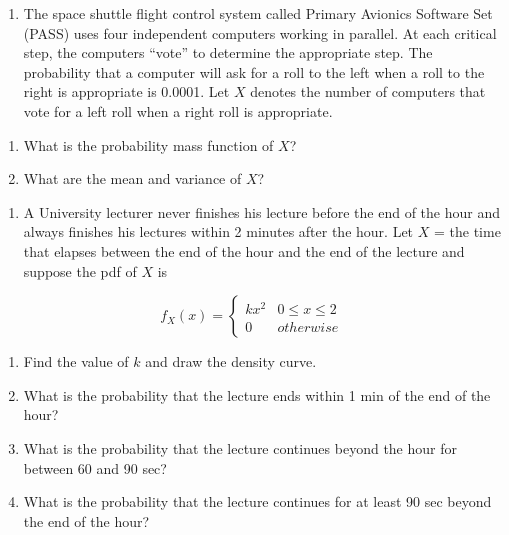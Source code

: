 \documentclass[]{book}
\providecommand{\tightlist}{%
  \setlength{\itemsep}{0pt}\setlength{\parskip}{0pt}}
\begin{document}
\begin{enumerate}
\def\labelenumi{\arabic{enumi}.}
\setcounter{enumi}{9}
\tightlist
\item
  The space shuttle flight control system called Primary Avionics Software Set (PASS) uses four independent computers working in parallel. At each critical step, the computers ``vote'' to determine the appropriate step. The probability that a computer will ask for a roll to the left when a roll to the right is appropriate is 0.0001. Let \(X\) denotes the number of computers that vote for a left roll when a right roll is appropriate.
\end{enumerate}

\begin{enumerate}
\def\labelenumi{\alph{enumi})}
\tightlist
\item
  What is the probability mass function of \(X\)?
\item
  What are the mean and variance of \(X\)?
\end{enumerate}

\begin{enumerate}
\def\labelenumi{\arabic{enumi}.}
\setcounter{enumi}{10}
\tightlist
\item
  A University lecturer never finishes his lecture before the end of the hour and always finishes his lectures within 2 minutes after the hour. Let \(X\) = the time that elapses between the end of the hour and the end of the lecture and suppose the pdf of \(X\) is
\end{enumerate}

\begin{equation}
f_X(x) =
\begin{cases} 
kx^2 & 0\leq  x\leq 2\\
0 & otherwise
\end{cases}
\end{equation}

\begin{enumerate}
\def\labelenumi{\alph{enumi})}
\tightlist
\item
  Find the value of \(k\) and draw the density curve.
\item
  What is the probability that the lecture ends within 1 min of the end of the hour?
\item
  What is the probability that the lecture continues beyond the hour for between 60 and 90 sec?
\item
  What is the probability that the lecture continues for at least 90 sec beyond the end of the hour?
\end{enumerate}
\end{document}
